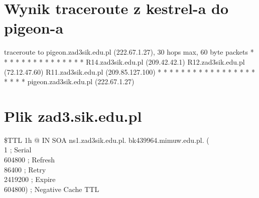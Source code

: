 \documentclass{article}
\begin{document}
\section*{Wynik traceroute z kestrel-a do pigeon-a}
traceroute to pigeon.zad3sik.edu.pl (222.67.1.27), 30 hops max, 60 byte packets  * * *  * * *  * * *  * * *  * * *  R14.zad3sik.edu.pl (209.42.42.1)  R12.zad3sik.edu.pl (72.12.47.60)  R11.zad3sik.edu.pl (209.85.127.100)  * * *  * * *  * * *  * * *  * * *  * * *  * * *  pigeon.zad3sik.edu.pl (222.67.1.27) \newline

\newpage
\section*{Plik zad3.sik.edu.pl}
\$TTL 1h
@ IN SOA ns1.zad3sik.edu.pl. bk439964.mimuw.edu.pl. ( \\
\hspace*{3cm}1 ; Serial \\
\hspace*{3cm}604800 ; Refresh \\
\hspace*{3cm}86400 ; Retry \\
\hspace*{3cm}2419200 ; Expire\\
\hspace*{3cm}604800) ; Negative Cache TTL\\
\end{document}
